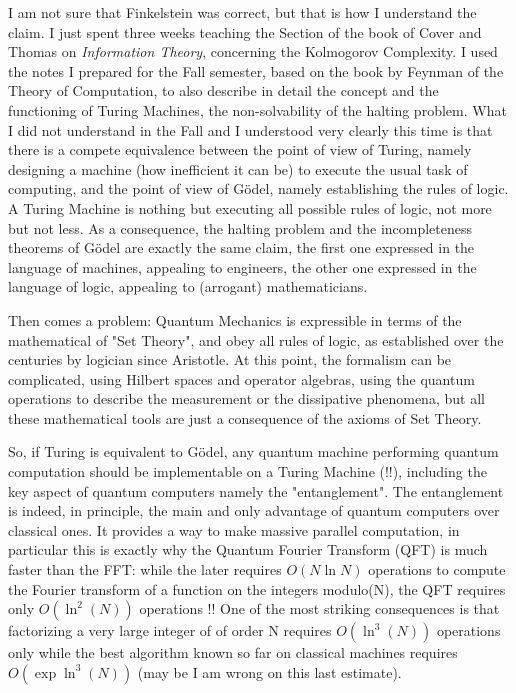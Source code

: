 I am not sure that Finkelstein was correct, but that is how I understand
the claim. I just spent three weeks teaching the Section of the book of
Cover and Thomas on {\em Information Theory}, concerning the Kolmogorov
Complexity. I used the notes I prepared for the Fall semester, based on
the book by Feynman of the Theory of Computation, to also describe in
detail the concept and the functioning of Turing Machines, the
non-solvability of the halting problem. What I did not understand in the
Fall and I understood very clearly this time is that there is a compete
equivalence between the point of view of Turing, namely designing a
machine (how inefficient it can be) to execute the usual task of
computing, and the point of view of G\"odel, namely establishing the
rules of logic. A Turing Machine is nothing but executing all possible
rules of logic, not more but not less. As a consequence, the halting
problem and the incompleteness theorems of G\"odel are exactly the same
claim, the first one expressed in the language of machines, appealing to
engineers, the other one expressed in the language of logic, appealing to
(arrogant) mathematicians.


    Then comes a problem: Quantum Mechanics is expressible in terms of the
    mathematical of "Set Theory", and obey all rules of logic, as established
    over the centuries by logician since Aristotle. At this point, the formalism
    can be complicated, using Hilbert spaces and operator algebras, using the
    quantum operations to describe the measurement or the dissipative phenomena,
    but all these mathematical tools are just a consequence of the axioms of Set
    Theory.


    So, if Turing is equivalent to G\"odel, any quantum machine performing quantum
    computation should be implementable on a Turing Machine (!!), including the
    key aspect of quantum computers namely the "entanglement". The entanglement
    is indeed, in principle, the main and only advantage of quantum computers
    over classical ones. It provides a way to make massive parallel computation,
    in particular this is exactly why the Quantum Fourier Transform (QFT) is
    much faster than the FFT: while the later requires $O(N \ln N)$ operations to
    compute the Fourier transform of a function on the integers modulo(N), the
    QFT requires only $O(\ln^2(N))$ operations !! One of the most striking
    consequences is that factorizing a very large integer of of order N requires
    $O(\ln^3(N))$ operations only while the best algorithm known so far on
    classical machines requires $O(\exp{ \ln^3(N)})$ (may be I am wrong on this last
    estimate).


